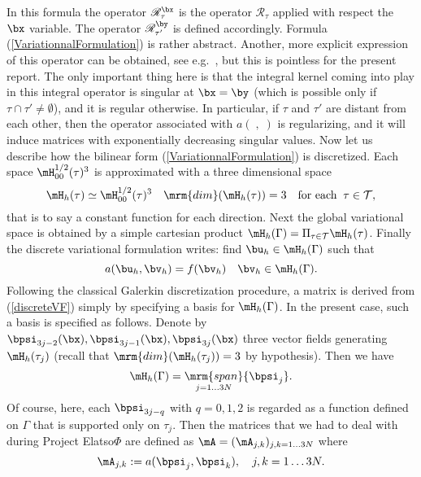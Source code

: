 In this formula the operator $\mathscr{R}_{\tau}^{\bx}$ is the operator $\mathscr{R}_{\tau}$ applied with respect the $\bx$ variable. The operator $\mathscr{R}_{\tau'}^{\by}$ 
is defined accordingly. Formula  (\ref{VariationnalFormulation}) is rather abstract. Another, more explicit expression of this operator can be obtained, 
see e.g.~\cite[\S.3.4.5.3]{Bebendorf2008}, but this is pointless for the present report. The only important thing here is that the integral kernel coming into play in this integral 
operator is singular at $\bx = \by$ (which is possible only if $\tau\cap \tau'\neq \emptyset$), and it is regular otherwise. In particular, if $\tau$ and $\tau'$
are distant from each other, then the operator associated with $a(\;,\;)$ is regularizing, and it will induce matrices with exponentially decreasing singular values.
Now let us describe how the bilinear form (\ref{VariationnalFormulation}) is discretized. Each space $\mH^{1/2}_{00}(\tau)^{3}$ is approximated with a three dimensional 
space 
\[
\mH_{h}(\tau)\simeq \mH^{1/2}_{00}(\tau)^{3}\quad \mrm{dim}(\mH_{h}(\tau)) = 3\quad \textrm{for each}\;\;\tau\in \mathcal{T},
\] 
that is to say a constant function for each direction. Next the global variational space is obtained by a simple cartesian product $\mH_{h}(\Gamma) = \Pi_{\tau\in \mathcal{T}}\mH_{h}(\tau)$.
Finally the discrete variational formulation writes: find $\bu_{h}\in \mH_{h}(\Gamma)$ such that 
\begin{equation}\label{discreteVF}
a(\bu_{h},\bv_{h}) = f(\bv_{h})\quad \bv_{h}\in \mH_{h}(\Gamma).
\end{equation}
Following the classical Galerkin discretization procedure, a matrix is derived from (\ref{discreteVF}) simply by specifying a basis for 
$\mH_{h}(\Gamma)$. In the present case, such a basis is specified as follows. Denote by $\bpsi_{3j-2}(\bx), \bpsi_{3j-1}(\bx),\bpsi_{3j}(\bx)$
three vector fields generating $\mH_{h}(\tau_{j})$ (recall that $\mrm{dim}(\mH_{h}(\tau_{j}) )= 3$ by hypothesis). Then we have 
$$
\mH_{h}(\Gamma) = \mathop{\mrm{span}}_{j=1\dots 3N}\{\bpsi_{j}\}.
$$
Of course, here, each $\bpsi_{3j-q}$ with $q=0,1,2$ is regarded as a function defined on $\Gamma$ that is supported 
only on $\tau_{j}$. Then the matrices that we had to deal with during Project Elatso$\Phi$ are defined as 
$\mA = (\mA_{j,k})_{j,k=1\dots 3N}$ where 
\begin{equation}\label{GalerkinMatrix}
\mA_{j,k}:=a(\bpsi_{j},\bpsi_{k}),\quad j,k = 1\dots 3N.
\end{equation}


